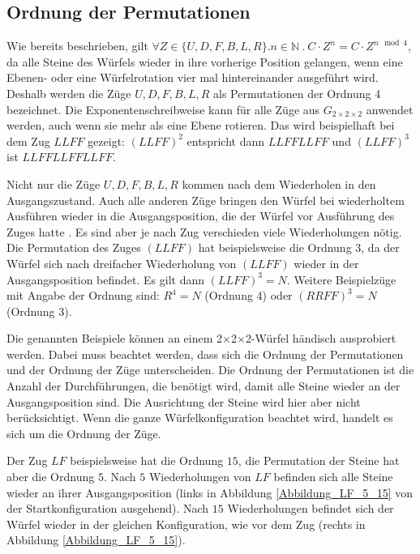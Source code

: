 \documentclass[12pt,a4paper, usenames, dvipsnames]{article}
\theoremstyle{mystyle}
\theoremstyle{definition}
\newcommand{\Gtwo}{\ensuremath{G_{2\times 2\times 2}}}
\newcommand{\Ttwo}{2$\times$2$\times$2-}
\begin{document}
%
%
%
%
%
%
%
%
%
%
%
%

\subsection{Ordnung der Permutationen}
 \label{Abschnitt_OrdnungPermutationen}

Wie bereits beschrieben, gilt $\forall Z \in \{ U, D, F, B, L, R \}. n \in \mathbb{N} \ . \ C \cdot Z^n=C \cdot Z^{n \mod 4}$, da alle Steine des Würfels wieder in ihre vorherige Position gelangen, wenn eine Ebenen- oder eine Würfelrotation vier mal hintereinander ausgeführt wird. Deshalb werden die Züge $U, D, F, B, L, R$ als Permutationen der Ordnung 4 bezeichnet. 
Die Exponentenschreibweise kann für alle Züge aus $\Gtwo$ anwendet werden, auch wenn sie mehr als eine Ebene rotieren. Das wird beispielhaft bei dem Zug $LLFF$ gezeigt: $(LLFF)^2$ entspricht dann $LLFFLLFF$ und $(LLFF)^3$ ist $LLFFLLFFLLFF$. 

Nicht nur die Züge $U, D, F, B, L, R$ kommen nach dem Wiederholen in den Ausgangszustand. Auch alle anderen Züge bringen den Würfel bei wiederholtem Ausführen wieder in die Ausgangsposition, die der Würfel vor Ausführung des Zuges hatte \cite{TD}. Es sind aber je nach Zug verschieden viele Wiederholungen nötig. Die Permutation des Zuges $(LLFF)$ hat beispielsweise die Ordnung 3, da der Würfel sich nach dreifacher Wiederholung von $(LLFF)$ wieder in der Ausgangsposition befindet. Es gilt dann $(LLFF)^3 = N$.
Weitere Beispielzüge mit Angabe der Ordnung sind: ${R^4= N}$ (Ordnung 4) oder ${(RRFF)^3 = N}$ (Ordnung 3).


Die genannten Beispiele können an einem \Ttwo Würfel händisch ausprobiert werden.
Dabei muss beachtet werden, dass sich die Ordnung der Permutationen und der Ordnung der Züge unterscheiden. Die Ordnung der Permutationen ist die Anzahl der Durchführungen, die benötigt wird, damit alle Steine wieder an der Ausgangsposition sind. Die Ausrichtung der Steine wird hier aber nicht berücksichtigt. Wenn die ganze Würfelkonfiguration beachtet wird, handelt es sich um die Ordnung der Züge.

Der Zug $LF$ beispielsweise hat die Ordnung $15$, die Permutation der Steine hat aber die Ordnung $5$. Nach $5$ Wiederholungen von $LF$ befinden sich alle Steine wieder an ihrer Ausgangsposition (links in Abbildung \ref{Abbildung_LF_5_15} von der Startkonfiguration ausgehend). Nach $15$ Wiederholungen befindet sich der Würfel wieder in der gleichen Konfiguration, wie vor dem Zug (rechts in Abbildung \ref{Abbildung_LF_5_15}).
\end{document}
